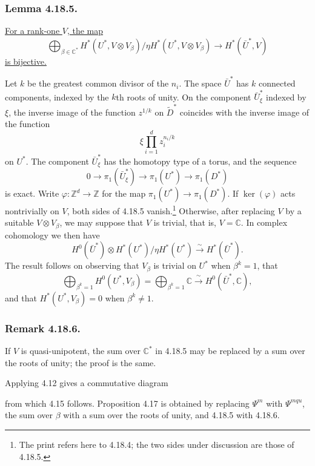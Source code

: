 \subsubsection*{Lemma 4.18.5.}
\underline{For a rank-one $V$, the map}
\[
\bigoplus_{\beta\in\mathbb C^*}
H^*(U^*,V\otimes V_\beta)/
 \eta H^*(U^*,V\otimes V_\beta)
\longrightarrow H^*(\bar U^*,V)
\]
\underline{is bijective.}

Let $k$ be the greatest common divisor of the $n_i$.  The space
$\bar U^*$ has $k$ connected components, indexed by the $k$th roots
of unity.  On the component $\bar U_\xi^*$ indexed by $\xi$, the
inverse image of the function $z^{1/k}$ on $\widetilde D^*$
coincides with the inverse image of the function
\[
\xi\prod_{i=1}^d z_i^{n_i/k}
\]
on $U^*$.  The component $\bar U_\xi^*$ has the homotopy type of a
torus, and the sequence
\[
0\longrightarrow\pi_1(\bar U_\xi^*)
 \longrightarrow\pi_1(U^*)\longrightarrow\pi_1(D^*)
\]
is exact.  Write $\varphi:\mathbb Z^d\to\mathbb Z$ for the map
$\pi_1(U^*)\to\pi_1(D^*)$.  If $\ker(\varphi)$ acts nontrivially on
$V$, both sides of 4.18.5 vanish.\footnote{The print refers here to
4.18.4; the two sides under discussion are those of 4.18.5.}
Otherwise, after replacing $V$ by a suitable $V\otimes V_\beta$, we
may suppose that $V$ is trivial, that is, $V=\mathbb C$.  In complex
cohomology we then have
\[
H^0(\bar U^*)\otimes
 H^*(U^*)/\eta H^*(U^*)
 \xrightarrow{\ \sim\ }H^*(\bar U^*).
\]
The result follows on observing that $V_\beta$ is trivial on $U^*$
when $\beta^k=1$, that
\[
\bigoplus_{\beta^k=1}H^0(U^*,V_\beta)
=\bigoplus_{\beta^k=1}\mathbb C
 \xrightarrow{\ \sim\ }H^0(\bar U^*,\mathbb C),
\]
and that $H^*(U^*,V_\beta)=0$ when $\beta^k\ne1$.

\subsubsection*{Remark 4.18.6.}
If $V$ is quasi-unipotent, the sum over $\mathbb C^*$ in 4.18.5 may
be replaced by a sum over the roots of unity; the proof is the same.

Applying 4.12 gives a commutative diagram
\begin{center}
\end{center}
from which 4.15 follows.  Proposition 4.17 is obtained by replacing
$\Psi^m$ with $\Psi^{mqu}$, the sum over $\beta$ with a sum over the
roots of unity, and 4.18.5 with 4.18.6.
